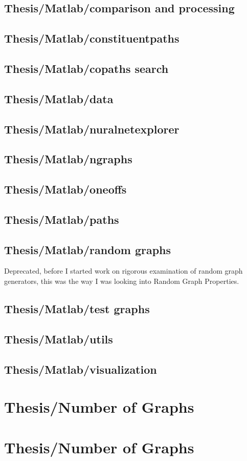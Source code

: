 \subsection*{Thesis/Matlab/comparison and processing}

\subsection*{Thesis/Matlab/constituentpaths}

\subsection*{Thesis/Matlab/copaths search}

\subsection*{Thesis/Matlab/data}

\subsection*{Thesis/Matlab/nuralnetexplorer}

\subsection*{Thesis/Matlab/ngraphs}

\subsection*{Thesis/Matlab/oneoffs}

\subsection*{Thesis/Matlab/paths}

\subsection*{Thesis/Matlab/random graphs}
Deprecated, before I started work on rigorous examination of random graph generators, this was the way I was looking into Random Graph Properties.

\subsection*{Thesis/Matlab/test graphs}

\subsection*{Thesis/Matlab/utils}

\subsection*{Thesis/Matlab/visualization}


\section*{Thesis/Number of Graphs}


\section*{Thesis/Number of Graphs}